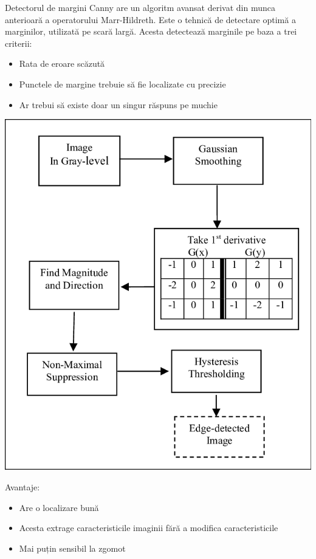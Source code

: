 \documentclass[10pt]{article}
\begin{document}
\> Detectorul de margini Canny are un algoritm avansat derivat din munca anterioară a operatorului Marr-Hildreth.
Este o tehnică de detectare optimă a marginilor, utilizată pe scară largă. Acesta detectează marginile pe baza a trei criterii: 

\begin{itemize}

  \item Rata de eroare scăzută 
  \item Punctele de margine trebuie să fie localizate cu precizie 
  \item Ar trebui să existe doar un singur răspuns pe muchie

\end{itemize}

\begin{center}

  \includegraphics[scale=0.3]{canny}
  
\end{center}

\> Avantaje:
\begin{itemize}

  \item Are o localizare bună
  \item Acesta extrage caracteristicile imaginii fără a modifica caracteristicile
  \item Mai puțin sensibil la zgomot

\end{itemize}
\end{document}
